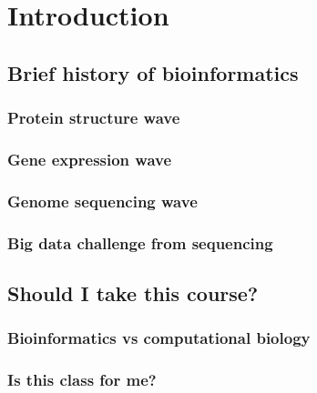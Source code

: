 \documentclass[
]{book}
\begin{document}
\hypertarget{intro}{%
\chapter{Introduction}\label{intro}}

\hypertarget{brief-history-of-bioinformatics}{%
\section{Brief history of bioinformatics}\label{brief-history-of-bioinformatics}}

\hypertarget{protein-structure-wave}{%
\subsection{Protein structure wave}\label{protein-structure-wave}}

\hypertarget{gene-expression-wave}{%
\subsection{Gene expression wave}\label{gene-expression-wave}}

\hypertarget{genome-sequencing-wave}{%
\subsection{Genome sequencing wave}\label{genome-sequencing-wave}}

\hypertarget{big-data-challenge-from-sequencing}{%
\subsection{Big data challenge from sequencing}\label{big-data-challenge-from-sequencing}}

\hypertarget{should-i-take-this-course}{%
\section{Should I take this course?}\label{should-i-take-this-course}}

\hypertarget{bioinformatics-vs-computational-biology}{%
\subsection{Bioinformatics vs computational biology}\label{bioinformatics-vs-computational-biology}}

\hypertarget{is-this-class-for-me}{%
\subsection{Is this class for me?}\label{is-this-class-for-me}}
\end{document}
